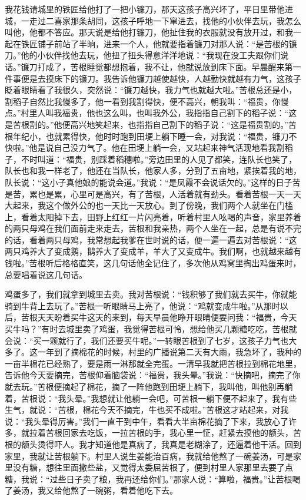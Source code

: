 \documentclass[12pt,UTF8]{ctexbook}
\begin{document}
我花钱请城里的铁匠给他打了一把小镰刀，那天这孩子高兴坏了，平日里带他进城，一走过二喜家那条胡同，这孩子呼地一下窜进去，找他的小伙伴去玩，我怎么叫他，他都不答应。那天说是给他打镰刀，他扯住我的衣服就没有放开过，和我一起在铁匠铺子前站了半晌，进来一个人，他就要指着镰刀对那人说：“是苦根的镰刀。”他的小伙伴找他去玩，他扭了扭头得意洋洋地说：“我现在没工夫跟你们说话。”镰刀打成了，苦根睡觉都想抱着，我不让，他就说放到床下面。早晨醒来第一件事便是去摸床下的镰刀。我告诉他镰刀越使越快，人越勤快就越有力气，这孩子眨着眼睛看了我很久，突然说：“镰刀越快，我力气也就越大啦。”苦根总还是小，割稻子自然比我慢多了，他一看到我割得快，便不高兴，朝我叫：“福贵，你慢点。”村里人叫我福贵，他也这么叫，也叫我外公，我指指自己割下的稻子说：“这是苦根割的。”他便高兴地笑起来，也指指自己割下的稻子说：“这是福贵割的。”苦根年纪小，也就累得快，他时时跑到田埂上躺下睡一会，对我说：“福贵，镰刀不快啦。”他是说自己没力气了。他在田埂上躺一会，又站起来神气活现地看我割稻子，不时叫道：“福贵，别踩着稻穗啦。”旁边田里的人见了都笑，连队长也笑了，队长也和我一样老了，他还在当队长，他家人多，分到了五亩地，紧挨着我的地，队长说：“这小子真他娘的能说会道。”我说：“是凤霞不会说话欠的。”这样的日子苦是苦，累也是累，心里可是高兴，有了苦根，人活着就有劲头。看着苦根一天一天大起来，我这个做外公的也一天比一天放心。到了傍晚，我们两个人就坐在门槛上，看着太阳掉下去，田野上红红一片闪亮着，听着村里人吆喝的声音，家里养着的两只母鸡在我们面前走来走去，苦根和我亲热，两个人坐在一起，总是有说不完的话，看着两只母鸡，我常想起我爹在世时说的话，便一遍一遍去对苦根说：“这两只鸡养大了变成鹅，鹅养大了变成羊，羊大了又变成牛。我们啊，也就越来越有钱啦。”苦根听后格格直笑，这几句话他全记住了，多次他从鸡窝里掏出鸡蛋来时，总要唱着说这几句话。

鸡蛋多了，我们就拿到城里去卖。我对苦根说：“钱积够了我们就去买牛，你就能骑到牛背上去玩了。”苦根一听眼睛马上亮了，他说：“鸡就变成牛啦。”从那时以后，苦根天天盼着买牛这天的来到，每天早晨他睁开眼睛便要问我：“福贵，今天买牛吗？”有时去城里卖了鸡蛋，我觉得苦根可怜，想给他买几颗糖吃吃，苦根就会说：“买一颗就行了，我们还要买牛呢。”一转眼苦根到了七岁，这孩子力气也大多了。这一年到了摘棉花的时候，村里的广播说第二天有大雨，我急坏了，我种的一亩半棉花已经熟了，要是雨一淋那就全完蛋。一清早我就把苦根拉到棉花地里，告诉他今天要摘完，苦根仰着脑袋说：“福贵，我头晕。”我说：“快摘吧，摘完了你就去玩。”苦根便摘起了棉花，摘了一阵他跑到田埂上躺下，我叫他，叫他别再躺着，苦根说：“我头晕。”我想就让他躺一会吧，可苦根一躺下便不起来了，我有些生气，就说：“苦根，棉花今天不摘完，牛也买不成啦。”苦根这才站起来，对我说：“我头晕得厉害。”我们一直干到中午，看看大半亩棉花摘了下来，我放心了许多，就拉着苦根回家去吃饭，一拉苦根的手，我心里一怔，赶紧去摸他的额头，苦根的额头烫得吓人。我才知道他是真病了，我真是老糊涂了，还逼着他干活。回到家里，我就让苦根躺下。村里人说生姜能治百病，我就给他熬了一碗姜汤，可是家里没有糖，想往里面撒些盐，又觉得太委屈苦根了，便到村里人家那里去要了点糖，我说：“过些日子卖了粮，我再还给你们。”那家人说：“算啦，福贵。”让苦根喝了姜汤，我又给他熬了一碗粥，看着他吃下去。
\end{document}
